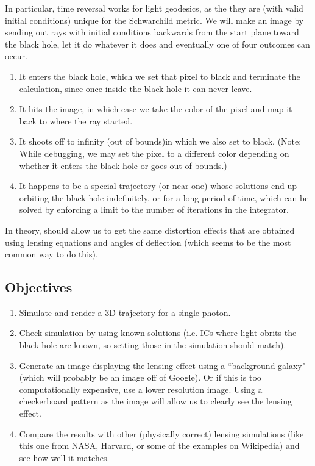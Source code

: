 \documentclass{article}
\begin{document}
In particular, time reversal works for light geodesics, as the they are (with valid initial conditions) unique for the Schwarchild metric. We will make an image by sending out rays with initial conditions backwards from the start plane toward the black hole, let it do whatever it does and eventually one of four outcomes can occur. 
\begin{enumerate}
	\item It enters the black hole, which we set that pixel to black and terminate the calculation, since once inside the black hole it can never leave.
	\item It hits the image, in which case we take the color of the pixel and map it back to where the ray started.
	\item It shoots off to infinity (out of bounds)in which we also set to black. (Note: While debugging, we may set the pixel to a different color depending on whether it enters the black hole or goes out of bounds.)
	\item It happens to be a special trajectory (or near one) whose solutions end up orbiting the black hole indefinitely, or for a long period of time, which can be solved by enforcing a limit to the number of iterations in the integrator.
\end{enumerate}
In theory, should allow us to get the same distortion effects that are obtained using lensing equations and angles of deflection (which seems to be the most common way to do this). 

\subsection*{Objectives}
\begin{enumerate}
	\item Simulate and render a 3D trajectory for a single photon.
	\item Check simulation by using known solutions (i.e. ICs where light obrits the black hole are known, so setting those in the simulation should match).
	\item Generate an image displaying the lensing effect using a ``background galaxy" (which will probably be an image off of Google). Or if this is too computationally expensive, use a lower resolution image. Using a checkerboard pattern as the image will allow us to clearly see the lensing effect. 
	\item Compare the results with other (physically correct) lensing simulations (like this one from \hyperlink{https://www.youtube.com/watch?v=k6JHryhlNVk}{NASA}, \hyperlink{https://lweb.cfa.harvard.edu/~bmcleod/castlepress.html}{Harvard}, or some of the examples on \hyperlink{https://en.wikipedia.org/wiki/Gravitational_lens}{Wikipedia}) and see how well it matches.
\end{enumerate}
\end{document}

